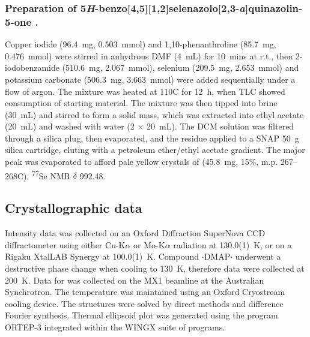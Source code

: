 \begin{refsection}
\subsubsection[Preparation of \refcmpd{tetracycle}.]{Preparation of 5\emph{H}-benzo[4,5][1,2]selenazolo[2,3-\emph{a}]quinazolin-5-one .}

Copper iodide (96.4~mg, 0.503~mmol) and 1,10-phenanthroline (85.7~mg, 0.476~mmol) were stirred in anhydrous DMF (4~mL) for 10~mins at r.t., then 2-iodobenzamide (510.6~mg, 2.067~mmol), selenium (209.5~mg, 2.653~mmol) and potassium carbonate (506.3~mg, 3.663~mmol) were added sequentially under a flow of argon.
The mixture was heated at 110\degree C for 12~h, when TLC showed consumption of starting material.
The mixture was then tipped into brine (30~mL) and stirred to form a solid mass, which was extracted into ethyl acetate (20~mL) and washed with water (2 $\times$ 20~mL).
The DCM solution was filtered through a silica plug, then evaporated, and the residue applied to a SNAP 50~g silica cartridge, eluting with a petroleum ether/ethyl acetate gradient.
The major peak was evaporated to afford pale yellow crystals of  (45.8~mg, 15\%, m.p. 267--268\degree C). \textsuperscript{77}Se NMR $\delta$ 992.48.

\subsection{Crystallographic data}
Intensity data was collected on an Oxford Diffraction SuperNova CCD diffractometer using either Cu-K$\alpha$ or Mo-K$\alpha$ radiation at 130.0(1)~K, or on a Rigaku XtalLAB Synergy at 100.0(1)~K. Compound $\cdot$DMAP$\cdot$ underwent a destructive phase change when cooling to 130~K, therefore data were collected at 200~K. Data for  was collected on the MX1 beamline at the Australian Synchrotron\autocite{Cowieson2015}. The temperature was maintained using an Oxford Cryostream cooling device. The structures were solved by direct methods and difference Fourier synthesis.\autocite{Sheldrick2015} Thermal ellipsoid plot was generated using the program ORTEP-3\autocite{Farrugia1997} integrated within the WINGX\autocite{Farrugia1999} suite of programs.


\end{refsection}

